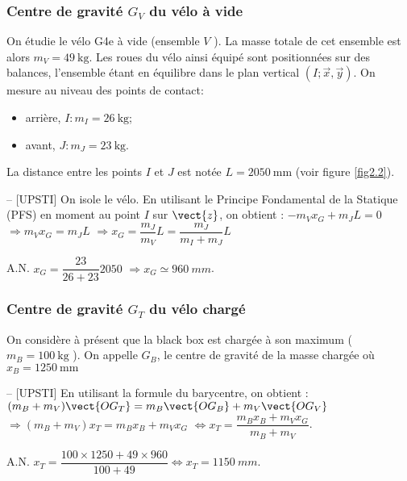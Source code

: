 \subsubsection{Centre de gravité \(G_{V}\) du vélo à vide}
On étudie le vélo G4e à vide (ensemble \(V\) ). La masse totale de cet ensemble est alors \(m_{V}=49 \mathrm{~kg}\). Les roues du vélo ainsi équipé sont positionnées sur des balances, l'ensemble étant en équilibre dans le plan vertical \((I ; \vec{x}, \vec{y})\). On mesure au niveau des points de contact:
\begin{itemize}
\item arrière, \(I: m_{I}=26 \mathrm{~kg}\);
  \item avant, \(J: m_{J}=23 \mathrm{~kg}\).
\end{itemize}
La distance entre les points \(I\) et \(J\) est notée \(L=2050 \mathrm{~mm}\) (voir figure \ref{fig2.2}).\\
\fi

\ifprof
\begin{corrige}-- [UPSTI]
On isole le vélo. En utilisant le Principe Fondamental de la Statique (PFS) en moment au point $I$ sur $\vect{z}$, on obtient :
$-m_V x_G+m_J L=0$ 
$\Rightarrow m_V x_G = m_J L$
$\Rightarrow x_G=\dfrac{m_J}{m_V}  L=\dfrac{m_J}{m_I+m_J}  L$

A.N. $x_G=\dfrac{23}{26+23}2050$ $\Rightarrow  x_G \simeq \SI{960}{mm}$.

\end{corrige}
\else
\fi

\subsubsection{Centre de gravité \(G_{T}\) du vélo chargé}
\ifprof
\else
On considère à présent que la black box est chargée à son maximum ( \(m_{B}=100 \mathrm{~kg}\) ). On appelle \(G_{B}\), le centre de gravité de la masse chargée où \(x_{B}=1250 \mathrm{~mm}\)
\fi

\ifprof
\begin{corrige}-- [UPSTI]
En utilisant la formule du barycentre, on obtient :
$(m_B+m_V ) \vect{OG_T}  =m_B \vect{OG_B}+m_V \vect{OG_V}$ $\Rightarrow  (m_B+m_V ) x_T=m_B x_B+m_V x_G$ $\Leftrightarrow  x_T=\dfrac{m_B x_B+m_V x_G}{m_B+m_V}$.

A.N. $x_T=\dfrac{100\times 1250+49\times 960}{100+49} \Leftrightarrow x_T=\SI{1150}{mm}$.

\end{corrige}
\else
\fi

